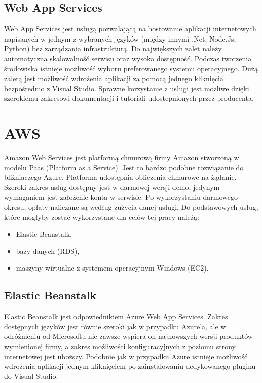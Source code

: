 \subsection{Web App Services}
Web App Services jest usługą pozwalającą na hostowanie aplikacji internetowych napisanych w jednym z wybranych języków (między innymi .Net, Node.Js, Python) bez zarządzania infrastrukturą. Do największych zalet należy automatyczna skalowalność serwisu oraz wysoka dostępność. Podczas tworzenia środowiska istnieje możliwość wyboru preferowanego systemu operacyjnego. Dużą zaletą jest możliwość wdrożenia aplikacji za pomocą jednego kliknięcia bezpośrednio z Visual Studio. Sprawne korzystanie z usługi jest możliwe dzięki szerokiemu zakresowi dokumentacji i tutoriali udostepnionych przez producenta.

\section{AWS} \label{aws}
Amazon Web Services jest platformą chmurową firmy Amazon stworzoną w modelu Paas (Platform as a Service). Jest to bardzo podobne rozwiązanie do bliźniaczego Azure. Platforma udostępnia obliczenia chmurowe na żądanie. Szeroki zakres usług dostępny jest w darmowej wersji demo, jedynym wymaganiem jest założenie konta w serwisie. Po wykorzystaniu darmowego okresu, opłaty naliczane są według zużycia danej usługi. Do podstawowych usług, które mogłyby zostać wykorzystane dla celów tej pracy należą:
\begin{itemize}
    \item Elastic Beanstalk,
    \item bazy danych (RDS),
    \item maszyny wirtualne z systemem operacyjnym Windows (EC2).
\end{itemize}
\subsection{Elastic Beanstalk}
Elastic Beanstalk jest odpowiednikiem Azure Web App Services. Zakres dostępnych języków jest równie szeroki jak w przypadku Azure'a, ale w odróżnieniu od Microsoftu nie zawsze wspiera on najnowszych wersji produktów wymienionej firmy, a zakres możliwości konfiguracyjnych z poziomu strony internetowej jest uboższy. Podobnie jak w przypadku Azure istnieje możliwość wdrożenia aplikacji jednym kliknięciem po zainstalowaniu dedykowanego pluginu do Visual Studio.